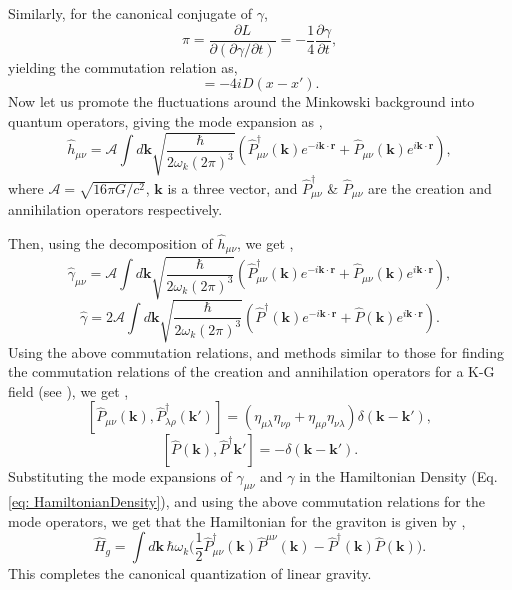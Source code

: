\documentclass[12pt,a4paper]{report}
\theoremstyle{plain}
\theoremstyle{definition}
\theoremstyle{remark}
\newcommand{\munu}{\mu\nu}
\begin{document}
Similarly, for the canonical conjugate of $\gamma$,
\begin{equation}
    \pi = \frac{\partial L}{\partial (\partial \gamma/\partial t)} = -\frac{1}{4}\frac{\partial \gamma}{\partial t},
\end{equation}
yielding the commutation relation as,
\begin{equation}
    [\gamma(x), \gamma(x')] = -4iD(x-x').
\end{equation}
Now let us promote the fluctuations around the Minkowski background into quantum operators, giving the mode expansion as \cite{Bose_2022},
\begin{equation}
    \hat{h}_{\munu} = \mathcal{A}\int d\bm{k} \sqrt{\frac{\hbar}{2\omega_k(2\pi)^3}}(\hat{P}_{\munu}^{\dagger}(\bm{k})e^{-i\bm{k}\cdot\bm{r}} + \hat{P}_{\munu}(\bm{k})e^{i\bm{k}\cdot\bm{r}}),
\end{equation}
where $\mathcal{A} = \sqrt{16\pi G/c^2}$, $\bm{k}$ is a three vector, and $\hat{P}_{\munu}^{\dagger}$ \& $\hat{P}_{\munu}$ are the creation and annihilation operators respectively.


Then, using the decomposition of $\hat{h}_{\munu}$, we get \cite{Bose_2022},
\begin{equation} \label{eq: gamma_munu}
    \hat{\gamma}_{\munu} = \mathcal{A}\int d\bm{k} \sqrt{\frac{\hbar}{2\omega_k(2\pi)^3}}(\hat{P}_{\munu}^{\dagger}(\bm{k})e^{-i\bm{k}\cdot\bm{r}} + \hat{P}_{\munu}(\bm{k})e^{i\bm{k}\cdot\bm{r}}),
\end{equation}
\begin{equation} \label{eq: gamma}
    \hat{\gamma} = 2\mathcal{A}\int d\bm{k} \sqrt{\frac{\hbar}{2\omega_k(2\pi)^3}}(\hat{P}^{\dagger}(\bm{k})e^{-i\bm{k}\cdot\bm{r}} + \hat{P}(\bm{k})e^{i\bm{k}\cdot\bm{r}}).
\end{equation}
Using the above commutation relations, and methods similar to those for finding the commutation relations of the creation and annihilation operators for a K-G field (see \citet[chap. 2]{Peskin}), we get \cite{Bose_2022},
\begin{equation}\label{eq: Pmunucomm}
    [\hat{P}_{\munu}(\bm{k}), \hat{P}_{\lambda\rho}^{\dagger}(\bm{k'})] = (\eta_{\mu\lambda}\eta_{\nu\rho} + \eta_{\mu\rho}\eta_{\nu\lambda})\delta(\bm{k} - \bm{k'}),
\end{equation}
\begin{equation}\label{eq: Pcomm}
    [\hat{P}(\bm{k}), \hat{P}^{\dagger}\bm{k'}] = -\delta(\bm{k} - \bm{k'}).
\end{equation}
Substituting the mode expansions of $\gamma_{\munu}$ and $\gamma$ in the Hamiltonian Density (Eq. \ref{eq: HamiltonianDensity}), and using the above commutation relations for the mode operators, we get that the Hamiltonian for the graviton is given by \cite{Bose_2022, Gupta_1952},
\begin{equation}
    \hat{H}_g = \int d\bm{k}\,\hbar\omega_k\bigg(\frac{1}{2}\hat{P}_{\munu}^{\dagger}(\bm{k})\hat{P}^{\munu}(\bm{k}) - \hat{P}^{\dagger}(\bm{k})\hat{P}(\bm{k})\bigg).
    \label{eq: GravitonHamiltonian}
\end{equation}
This completes the canonical quantization of linear gravity.
\end{document}
